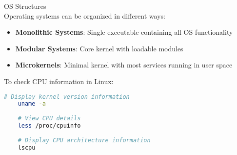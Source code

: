 \begin{definition}{OS Structures}\\
    Operating systems can be organized in different ways:
    \begin{itemize}
        \item \textbf{Monolithic Systems}: Single executable containing all OS functionality
        \item \textbf{Modular Systems}: Core kernel with loadable modules
        \item \textbf{Microkernels}: Minimal kernel with most services running in user space
    \end{itemize}
\end{definition}

\begin{example}
    To check CPU information in Linux:
    \begin{lstlisting}[language=bash, style=basesmol]
    # Display kernel version information
    uname -a
    
    # View CPU details
    less /proc/cpuinfo
    
    # Display CPU architecture information
    lscpu
    \end{lstlisting}
\end{example}

